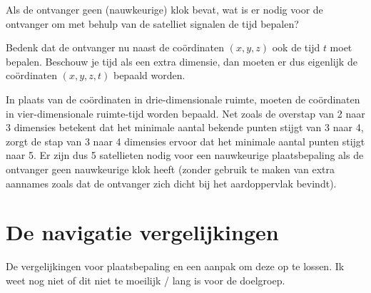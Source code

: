\begin{opgave}[\ster\vinger]
	Als de ontvanger geen (nauwkeurige) klok bevat, wat is er nodig voor de ontvanger om met behulp van de satelliet signalen de tijd bepalen?
	\begin{hint}
		Bedenk dat de ontvanger nu naast de co\"ordinaten $(x, y, z)$ ook de tijd $t$ moet bepalen. Beschouw je tijd als een extra dimensie, dan moeten er dus eigenlijk de co\"ordinaten $(x, y, z, t)$ bepaald worden.
	\end{hint}
	\begin{antwoord}
		In plaats van de co\"ordinaten in drie-dimensionale ruimte, moeten de co\"ordinaten in vier-dimensionale ruimte-tijd worden bepaald. Net zoals de overstap van 2 naar 3 dimensies betekent dat het minimale aantal bekende punten stijgt van 3 naar 4, zorgt de stap van 3 naar 4 dimensies ervoor dat het minimale aantal punten stijgt naar 5. Er zijn dus 5 satellieten nodig voor een nauwkeurige plaatsbepaling als de ontvanger geen nauwkeurige klok heeft (zonder gebruik te maken van extra aannames zoals dat de ontvanger zich dicht bij het aardoppervlak bevindt).
	\end{antwoord} 
\end{opgave}

\section{De navigatie vergelijkingen}

De vergelijkingen voor plaatsbepaling en een aanpak om deze op te lossen. Ik weet nog niet of dit niet te moeilijk / lang is voor de doelgroep. 